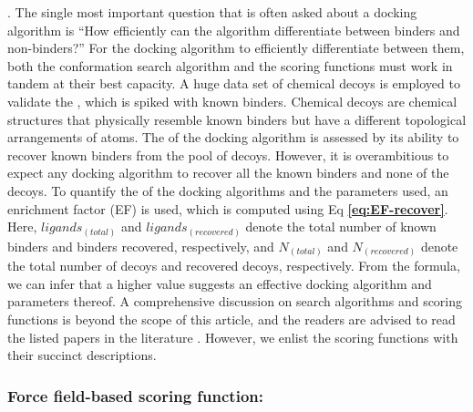 {\color{red}{For a docking tool to be effective and yield reliable result, the search algorithm and the scoring function are crucial and carefully developed}}.  The single most important question that is often asked about a docking algorithm is “How efficiently can the algorithm differentiate between binders and non-binders?” For the docking algorithm to efficiently differentiate between them, both the conformation search algorithm and the scoring functions must work in tandem at their best capacity. A huge data set of chemical decoys is employed to validate the {\color{red}{accuracy}}, which is spiked with known binders. Chemical decoys are chemical structures that physically resemble known binders but have a different topological arrangements of atoms. The {\color{red}{accuracy}} of the docking algorithm is assessed by its ability to recover known binders from the pool of decoys. However, it is overambitious to expect any docking algorithm to recover all the known binders and none of the decoys. To quantify the {\color{red}{accuracy}} of the docking algorithms and the parameters used, an enrichment factor (EF)\cite{bib4} is used, which is computed using Eq \textbf{\ref{eq:EF-recover}}.
{
}
Here, $ligands_{(total)}$ and $ligands_{(recovered)}$ denote the total number of known binders and binders recovered, respectively, and $N_{(total)}$ and $N_{(recovered)}$ denote the total number of decoys and recovered decoys, respectively. From the formula, we can infer that a higher value suggests an effective docking algorithm and parameters thereof. A comprehensive discussion on search algorithms and scoring functions is beyond the scope of this article, and the readers are advised to read the listed papers in the literature \cite{bib5, bib6}. However, we enlist the scoring functions with their succinct descriptions. 

\subsubsection*{Force field-based scoring function:}

